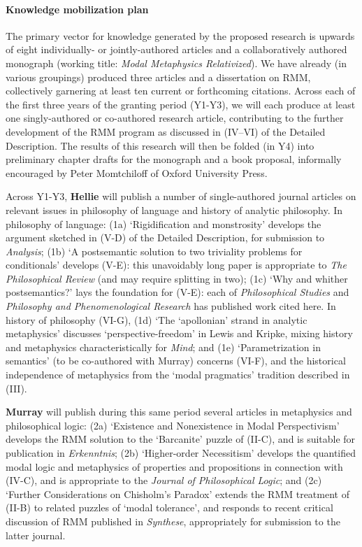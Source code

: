 \documentclass[12pt]{article}
\begin{document}
\paragraph{Knowledge mobilization plan}

The primary vector for knowledge generated by the proposed research is upwards
of eight individually- or jointly-authored articles and a collaboratively
authored monograph (working title: \emph{Modal Metaphysics Relativized}).  We
have already (in various groupings) produced three articles and a dissertation
on RMM, collectively garnering at least ten current or forthcoming citations.
Across each of the first three years of the granting period (Y1-Y3), we will
each produce at least one singly-authored or co-authored research article,
contributing to the further development of the RMM program as discussed in
(IV--VI) of the Detailed Description. The results of this research will then
be folded (in Y4) into preliminary chapter drafts for the monograph and a book
proposal, informally encouraged by Peter Momtchiloff of Oxford University
Press.  

\smallskip{}

Across Y1-Y3, \textbf{Hellie} will publish a number of single-authored journal
articles on relevant issues in philosophy of language and history of analytic
philosophy. In philosophy of language: 
(1a) `Rigidification and
monstrosity' develops the argument sketched in (V-D) of the Detailed
Description, for submission to \emph{Analysis}; (1b) `A postsemantic solution
to two triviality problems for conditionals' develops (V-E): this unavoidably
long paper is appropriate to \emph{The Philosophical Review} (and may require
splitting in two); (1c) `Why and whither postsemantics?' lays the foundation
for (V-E): each of \emph{Philosophical Studies} and \emph{Philosophy and
Phenomenological Research} has published work cited here. In history of
philosophy (VI-G), (1d) `The `apollonian' strand in analytic metaphysics'
discusses `perspective-freedom' in Lewis and Kripke, mixing history and
metaphysics characteristically for \emph{Mind}; and (1e) `Parametrization in
semantics' (to be co-authored with Murray) concerns (VI-F), and the historical
independence of metaphysics from the `modal pragmatics' tradition described in
(III).    

\smallskip{}

\textbf{Murray} will publish during this same period several articles in
metaphysics and philosophical logic: (2a) `Existence and
Nonexistence in Modal Perspectivism' develops the RMM solution to the
`Barcanite' puzzle of (II-C), and is suitable for publication in \emph{Erkenntnis}; (2b)
`Higher-order Necessitism' develops the quantified modal logic and metaphysics of properties and
propositions in connection with (IV-C), and is appropriate to the \emph{Journal of
Philosophical Logic}; and (2c) `Further Considerations on Chisholm's Paradox'
extends the RMM treatment of (II-B) to related puzzles of `modal tolerance',
and responds to recent critical discussion of RMM published in
\emph{Synthese}, appropriately for submission to the latter journal. 
\end{document}
